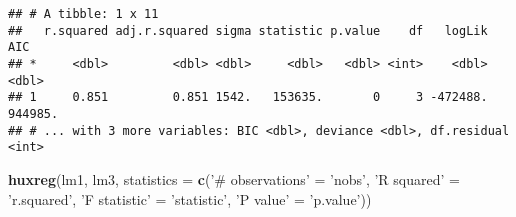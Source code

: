 \documentclass[]{article}
\newenvironment{Shaded}{\begin{snugshade}}{\end{snugshade}}
\newcommand{\KeywordTok}[1]{\textcolor[rgb]{0.13,0.29,0.53}{\textbf{#1}}}
\newcommand{\DataTypeTok}[1]{\textcolor[rgb]{0.13,0.29,0.53}{#1}}
\newcommand{\StringTok}[1]{\textcolor[rgb]{0.31,0.60,0.02}{#1}}
\newcommand{\NormalTok}[1]{#1}
\begin{document}
\begin{verbatim}
## # A tibble: 1 x 11
##   r.squared adj.r.squared sigma statistic p.value    df   logLik     AIC
## *     <dbl>         <dbl> <dbl>     <dbl>   <dbl> <int>    <dbl>   <dbl>
## 1     0.851         0.851 1542.   153635.       0     3 -472488. 944985.
## # ... with 3 more variables: BIC <dbl>, deviance <dbl>, df.residual <int>
\end{verbatim}

\begin{Shaded}
\begin{Highlighting}[]
\KeywordTok{huxreg}\NormalTok{(lm1, lm3, }\DataTypeTok{statistics =} \KeywordTok{c}\NormalTok{(}\StringTok{'# observations'}\NormalTok{ =}\StringTok{ 'nobs'}\NormalTok{, }\StringTok{'R squared'}\NormalTok{ =}\StringTok{ 'r.squared'}\NormalTok{, }\StringTok{'F statistic'}\NormalTok{ =}\StringTok{ 'statistic'}\NormalTok{,}
  \StringTok{'P value'}\NormalTok{ =}\StringTok{ 'p.value'}\NormalTok{))}
\end{Highlighting}
\end{Shaded}
\end{document}
